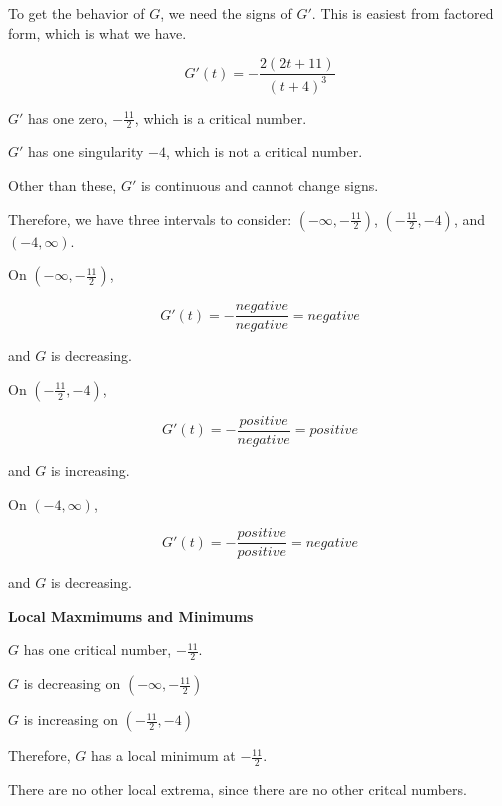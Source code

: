 \documentclass{ximera}
\begin{document}
\begin{explanation}

To get the behavior of $G$, we need the signs of $G'$.  This is easiest from factored form, which is what we have.


\[
G'(t) = -\frac{2(2t+11)}{(t+4)^3}
\]


$G'$ has one zero, $-\frac{11}{2}$, which is a critical number. 


$G'$ has one singularity $-4$, which is not a critical number. 



Other than these, $G'$ is continuous and cannot change signs.


Therefore, we have three intervals to consider:  $\left( -\infty, -\frac{11}{2} \right)$, $\left( -\frac{11}{2}, -4 \right)$, and $(-4, \infty)$.



On $\left( -\infty, -\frac{11}{2} \right)$, 

\[
G'(t) = -\frac{negative}{negative} = negative
\]


and $G$ is decreasing.






On $\left( -\frac{11}{2}, -4 \right)$, 

\[
G'(t) = -\frac{positive}{negative} = positive
\]


and $G$ is increasing.







On $(-4, \infty)$, 

\[
G'(t) = -\frac{positive}{positive} = negative
\]


and $G$ is decreasing.





\end{explanation}
















\textbf{\textcolor{purple!85!blue}{Local Maxmimums and Minimums}} 

\begin{explanation}


$G$ has one critical number, $-\frac{11}{2}$.


$G$ is decreasing on $\left( -\infty, -\frac{11}{2} \right)$

$G$ is increasing on $\left( -\frac{11}{2}, -4 \right)$

Therefore, $G$ has a local minimum at $-\frac{11}{2}$.


There are no other local extrema, since there are no other critcal numbers.


\end{explanation}
\end{document}
